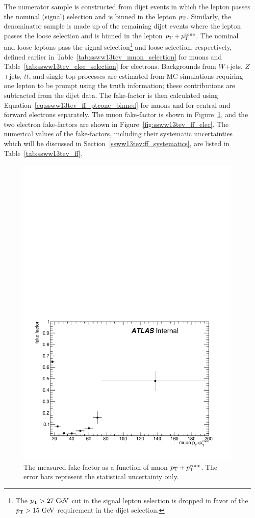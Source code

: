 The numerator sample is constructed from dijet events in which the lepton passes the nominal (signal) selection and is binned in the lepton $p_{\mathrm{T}}$.
Similarly, the denominator sample is made up of the remaining dijet events where the lepton passes the loose selection and is binned in the lepton $p_{\mathrm{T}}+p_{\mathrm{T}}^{\textrm{cone}}$.
The nominal and loose leptons pass the signal selection\footnote{The $\pt > 27\gev$ cut in the signal lepton selection is dropped in favor of the $\pt > 15\gev$ requirement in the dijet selection.} and loose selection, respectively, defined earlier in Table~\ref{tab:ssww13tev_muon_selection} for muons and Table~\ref{tab:ssww13tev_elec_selection} for electrons.
Backgrounds from $W$+jets, $Z$+jets, $t\bar{t}$, and single top processes are estimated from MC simulations requiring one lepton to be prompt using the truth information; these contributions are subtracted from the dijet data.
The fake-factor is then calculated using Equation~\ref{eq:ssww13tev_ff_ptcone_binned} for muons and for central and forward electrons separately.
The muon fake-factor is shown in Figure~\ref{fig:ssww13tev_ff_muon}, and the two electron fake-factors are shown in Figure~\ref{fig:ssww13tev_ff_elec}.
The numerical values of the fake-factors, including their systematic uncertainties which will be discussed in Section~\ref{ssww13tev:ff_systematics}, are listed in Table~\ref{tab:ssww13tev_ff}.

\begin{figure}[htbp]
  \centering
  \includegraphics[width=.6\textwidth]{figs/ssww_13tev/backgrounds/ff/muon_ff}
  \caption{The measured fake-factor as a function of muon $p_{\mathrm{T}}+p_{\mathrm{T}}^{\textrm{cone}}$.  The error bars represent the statistical uncertainty only.}
  \label{fig:ssww13tev_ff_muon}
\end{figure}

